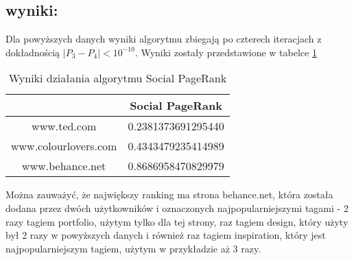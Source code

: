 \subsection*{wyniki:}
Dla powyższych danych wyniki algorytmu zbiegają po czterech iteracjach z dokładnością
$|P_3 - P_4|  < 10^{-10}$. Wyniki zostały przedstawione w tabelce \ref{fig:social_page_simple_wyniki}


\begin{table}[h]
  \centering
    \begin{tabular}{ | c | c | }
\hline
&Social PageRank \\
\hline
www.ted.com & 0.2381373691295440 \\
www.colourlovers.com  & 0.4343479235414989 \\
www.behance.net & 0.8686958470829979 \\
\hline
\end{tabular}
  \caption{Wyniki działania algorytmu Social PageRank}
  \label{fig:social_page_simple_wyniki}
\end{table}


Można zauważyć, że największy ranking ma strona behance.net, która została dodana przez dwóch użytkowników i oznaczonych najpopularniejszymi tagami - 2 razy tagiem portfolio, użytym tylko dla tej strony, raz tagiem design, który użyty był 2 razy w powyższych danych i również raz tagiem inspiration, który jest najpopularniejszym tagiem, użytym w przykładzie aż 3 razy. 











